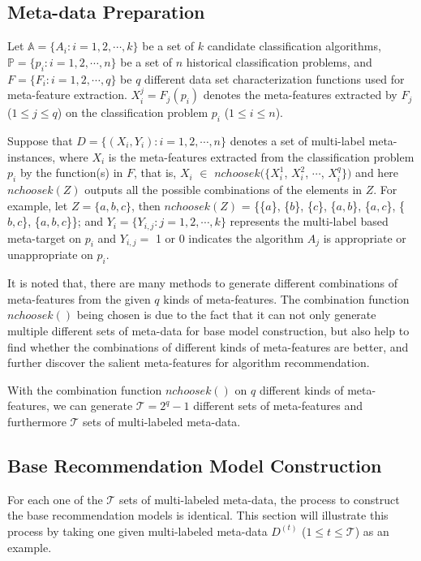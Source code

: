 \documentclass[acmsmall]{acmart}
\begin{document}
\subsection{Meta-data Preparation}\label{subsec:DataCollection}

Let $\mathbb{A} = \{A_i: i = 1, 2, \cdots, k\}$ be a set of $k$
candidate classification algorithms, $\mathbb{P} = \{p_i: i = 1, 2,
\cdots, n\}$ be a set of $n$ historical classification problems, and
$F = \{F_i: i = 1, 2, \cdots, q\}$ be $q$ different data set
characterization functions used for meta-feature extraction.
$X_{i}^{j} = F_{j}(p_i)$ denotes the meta-features extracted by
$F_j$ ($1\leq j \leq q$) on the classification problem $p_i$ ($1\leq
i\leq n$).

Suppose that $D = \{(X_i, Y_i): i = 1, 2, \cdots, n\}$ denotes a set
of multi-label meta-instances, where $X_i$ is the meta-features
extracted from the classification problem $p_i$ by the function(s)
in $F$, that is, $X_i$ $\in$ $nchoosek(\{X_{i}^{1}$, $X_{i}^{2}$,
$\cdots$, $X_{i}^{q}\})$ and here $nchoosek(Z)$ outputs all the
possible combinations of the elements in $Z$. For example, let $Z =
\{a,b,c\}$, then $nchoosek(Z)$ = \{\{$a$\}, \{$b$\}, \{$c$\},
\{$a,b$\}, \{$a,c$\}, \{$b,c$\}, \{$a,b,c$\}\}; and $Y_i =
\{Y_{i,j}: j = 1, 2, \cdots, k\}$ represents the multi-label based
meta-target on $p_i$ and $Y_{i,j} =$ 1 or 0 indicates the algorithm
$A_j$ is appropriate or unappropriate on $p_i$.

It is noted that, there are many methods to generate different
combinations of meta-features from the given $q$ kinds of
meta-features. The combination function $nchoosek()$ being chosen is
due to the fact that it can not only generate multiple different
sets of meta-data for base model construction, but also help to find
whether the combinations of different kinds of meta-features are
better, and further discover the salient meta-features for algorithm
recommendation.

With the combination function $nchoosek()$ on $q$ different kinds of
meta-features, we can generate $\mathcal{T} = 2^q - 1$ different sets of
meta-features and furthermore $\mathcal{T}$ sets of multi-labeled meta-data.

\subsection{Base Recommendation Model Construction}\label{subsec:baseModel}

For each one of the $\mathcal{T}$ sets of multi-labeled meta-data, the process
to construct the base recommendation models is identical. This
section will illustrate this process by taking one given
multi-labeled meta-data $D^{(t)}$ ($1 \leq t \leq \mathcal{T}$) as an example.
\end{document}
